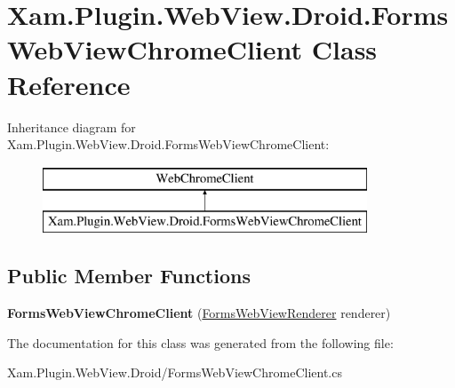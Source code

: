 \hypertarget{class_xam_1_1_plugin_1_1_web_view_1_1_droid_1_1_forms_web_view_chrome_client}{}\section{Xam.\+Plugin.\+Web\+View.\+Droid.\+Forms\+Web\+View\+Chrome\+Client Class Reference}
\label{class_xam_1_1_plugin_1_1_web_view_1_1_droid_1_1_forms_web_view_chrome_client}
Inheritance diagram for Xam.\+Plugin.\+Web\+View.\+Droid.\+Forms\+Web\+View\+Chrome\+Client\+:\begin{figure}[H]
\begin{center}
\leavevmode
\includegraphics[height=2.000000cm]{class_xam_1_1_plugin_1_1_web_view_1_1_droid_1_1_forms_web_view_chrome_client}
\end{center}
\end{figure}
\subsection*{Public Member Functions}
\begin{DoxyCompactItemize}
\item 
\mbox{\label{class_xam_1_1_plugin_1_1_web_view_1_1_droid_1_1_forms_web_view_chrome_client_a50968937f622c73076f7786ebcfa4144}} 
{\bfseries Forms\+Web\+View\+Chrome\+Client} (\hyperlink{class_xam_1_1_plugin_1_1_web_view_1_1_droid_1_1_forms_web_view_renderer}{Forms\+Web\+View\+Renderer} renderer)
\end{DoxyCompactItemize}


The documentation for this class was generated from the following file\+:\begin{DoxyCompactItemize}
\item 
Xam.\+Plugin.\+Web\+View.\+Droid/Forms\+Web\+View\+Chrome\+Client.\+cs\end{DoxyCompactItemize}
